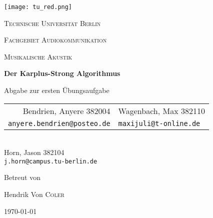\begin{titlepage}
    \centering
    \texttt{[image: tu\_red.png]}\par
    {\scshape\huge Technische Universität Berlin \par}
    {\scshape\Large Fachgebiet Audiokommunikation\par}
    \vspace{1.5cm}
    {\scshape\LARGE Musikalische Akustik\par}
    \vspace{1.5cm}

    {\Huge\bfseries {Der Karplus-Strong Algorithmus}\par}
    \vspace{0.1cm}
    {\large Abgabe zur ersten Übungsaufgabe\par}
    \vspace{1cm}

    {\itshape
        \begin{tabular}{rl}
          Bendrien, Anyere 382004 &
          Wagenbach, Max 382110 \\
          \vspace{0.2cm}
          \small \texttt{anyere.bendrien@posteo.de} &
          \small \texttt{maxijuli@t-online.de}
        \end{tabular}\\
        Horn, Jason 382104 \\
        \small \texttt{j.horn@campus.tu-berlin.de} 
    }
    \vfill
    
    Betreut von\par
    Hendrik Von \textsc{Coler}
    \vspace{1cm}
    
    {\large \today\par}
\end{titlepage}